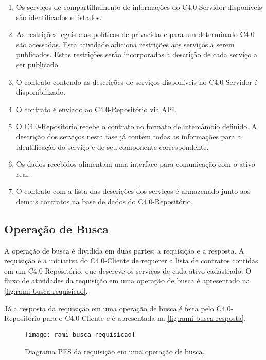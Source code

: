 \begin{enumerate}

	\item Os serviços de compartilhamento de informações do C4.0-Servidor disponíveis são identificados e listados.

	\item As restrições legais e as políticas de privacidade para um determinado C4.0 são acessadas. Esta atividade adiciona restrições aos serviços a serem publicados. Estas restrições serão incorporadas à descrição de cada serviço a ser publicado.

	\item O contrato contendo as descrições de serviços disponíveis no C4.0-Servidor é disponibilizado.

	\item O contrato é enviado ao C4.0-Repositório via API.

	\item O C4.0-Repositório recebe o contrato no formato de intercâmbio definido. A descrição dos serviços nesta fase já contém todas as informações para a identificação do serviço e de seu componente correspondente.

	\item Os dados recebidos alimentam uma interface para comunicação com o ativo real.

	\item O contrato com a lista das descrições dos serviços é armazenado junto aos demais contratos na base de dados do C4.0-Repositório.

\end{enumerate}

\subsection{Operação de Busca}

A operação de busca é dividida em duas partes: a requisição e a resposta. A requisição é a iniciativa do C4.0-Cliente de requerer a lista de contratos contidas em um C4.0-Repositório, que descreve os serviços de cada ativo cadastrado. O fluxo de atividades da requisição em uma operação de busca é apresentado na \autoref{fig:rami-busca-requisicao}.

Já a resposta da requisição em uma operação de busca é feita pelo C4.0-Repositório para o C4.0-Cliente e é apresentada na \autoref{fig:rami-busca-resposta}.

\begin{figure}[htb]
	\centering
	\texttt{[image: rami-busca-requisicao]}
	\caption{Diagrama PFS da requisição em uma operação de busca.}
	\label{fig:rami-busca-requisicao}
\end{figure}

